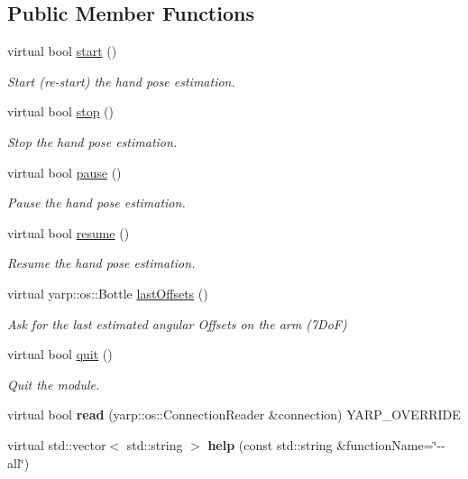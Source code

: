 \subsection*{Public Member Functions}
\begin{DoxyCompactItemize}
\item 
virtual bool \hyperlink{classhandPoseEstimation__IDL_a0168a812d2209bba67212dc2969bc763}{start} ()
\begin{DoxyCompactList}\small\item\em Start (re-\/start) the hand pose estimation. \end{DoxyCompactList}\item 
virtual bool \hyperlink{classhandPoseEstimation__IDL_a9d3f8b39a34db325c89b2c7b44ded1f1}{stop} ()
\begin{DoxyCompactList}\small\item\em Stop the hand pose estimation. \end{DoxyCompactList}\item 
virtual bool \hyperlink{classhandPoseEstimation__IDL_a1f1b82575fb40899ba846bb3afc21406}{pause} ()
\begin{DoxyCompactList}\small\item\em Pause the hand pose estimation. \end{DoxyCompactList}\item 
virtual bool \hyperlink{classhandPoseEstimation__IDL_aea26d5dfb9414ac732c8aee27d4b0bcc}{resume} ()
\begin{DoxyCompactList}\small\item\em Resume the hand pose estimation. \end{DoxyCompactList}\item 
virtual yarp\+::os\+::\+Bottle \hyperlink{classhandPoseEstimation__IDL_a195b385595237044aa81c8a60ec0c75c}{last\+Offsets} ()
\begin{DoxyCompactList}\small\item\em Ask for the last estimated angular Offsets on the arm (7\+DoF) \end{DoxyCompactList}\item 
virtual bool \hyperlink{classhandPoseEstimation__IDL_aeae04edc596badd5c68814d7709c8820}{quit} ()
\begin{DoxyCompactList}\small\item\em Quit the module. \end{DoxyCompactList}\item 
virtual bool {\bfseries read} (yarp\+::os\+::\+Connection\+Reader \&connection) Y\+A\+R\+P\+\_\+\+O\+V\+E\+R\+R\+I\+DE\label{classhandPoseEstimation__IDL_a29990dd4c33d73655d206b0d8e342c83}

\item 
virtual std\+::vector$<$ std\+::string $>$ {\bfseries help} (const std\+::string \&function\+Name=\char`\"{}-\/-\/all\char`\"{})\label{classhandPoseEstimation__IDL_ade8e064ba4c36b3f27c0868c0a7875b8}

\end{DoxyCompactItemize}


